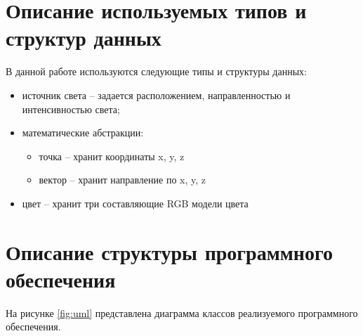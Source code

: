     \section{Описание используемых типов и структур данных}

        В данной работе используются следующие типы и структуры данных:
        
        \begin{itemize}
            \item источник света – задается расположением, направленностью и интенсивностью света;
            \item математические абстракции:
            \begin{itemize}
                \item точка -- хранит координаты x, y, z
                \item вектор -- хранит направление по x, y, z
            \end{itemize}
            \item цвет -- хранит три составляющие RGB модели цвета
        \end{itemize}

    \section{Описание структуры программного обеспечения}
    
        На рисунке \ref{fig:uml} представлена диаграмма классов реализуемого программного обеспечения.
        
